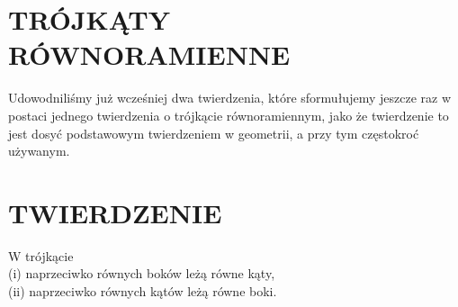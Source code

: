 \documentclass[10pt]{article}
\begin{document}
\section*{TRÓJKĄTY RÓWNORAMIENNE}
Udowodniliśmy już wcześniej dwa twierdzenia, które sformułujemy jeszcze raz w postaci jednego twierdzenia o trójkącie równoramiennym, jako że twierdzenie to jest dosyć podstawowym twierdzeniem w geometrii, a przy tym częstokroć używanym.

\section*{TWIERDZENIE}
W trójkącie\\
(i) naprzeciwko równych boków leżą równe kąty,\\
(ii) naprzeciwko równych kątów leżą równe boki.
\end{document}
